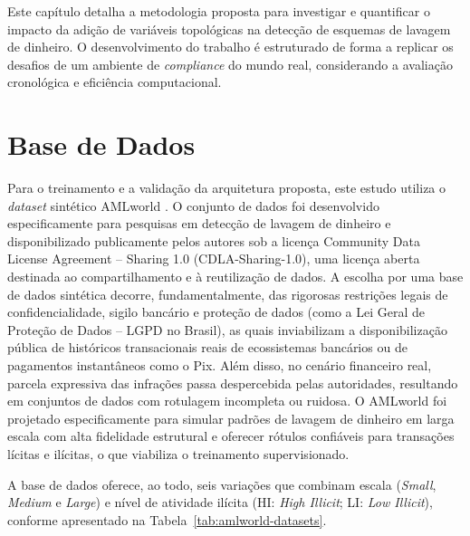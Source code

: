 \documentclass[a4paper,12pt,oneside,onecolumn,final,fleqn]{repUERJ}
\begin{document}
Este capítulo detalha a metodologia proposta para investigar e quantificar o impacto da adição de variáveis topológicas na detecção de esquemas de lavagem de dinheiro. O desenvolvimento do trabalho é estruturado de forma a replicar os desafios de um ambiente de \textit{compliance} do mundo real, considerando a avaliação cronológica e eficiência computacional.

\section{Base de Dados}

Para o treinamento e a validação da arquitetura proposta, este estudo utiliza o \textit{dataset} sintético AMLworld \cite{altman2023realistic}. O conjunto de dados foi desenvolvido especificamente para pesquisas em detecção de lavagem de dinheiro e disponibilizado publicamente pelos autores sob a licença Community Data License Agreement – Sharing 1.0 (CDLA-Sharing-1.0), uma licença aberta destinada ao compartilhamento e à reutilização de dados. A escolha por uma base de dados sintética decorre, fundamentalmente, das rigorosas restrições legais de confidencialidade, sigilo bancário e proteção de dados (como a Lei Geral de Proteção de Dados -- LGPD no Brasil), as quais inviabilizam a disponibilização pública de históricos transacionais reais de ecossistemas bancários ou de pagamentos instantâneos como o Pix. Além disso, no cenário financeiro real, parcela expressiva das infrações passa despercebida pelas autoridades, resultando em conjuntos de dados com rotulagem incompleta ou ruidosa. O AMLworld foi projetado especificamente para simular padrões de lavagem de dinheiro em larga escala com alta fidelidade estrutural e oferecer rótulos confiáveis para transações lícitas e ilícitas, o que viabiliza o treinamento supervisionado.

A base de dados oferece, ao todo, seis variações que combinam escala (\textit{Small},
\textit{Medium} e \textit{Large}) e nível de atividade ilícita (HI: \textit{High Illicit};
LI: \textit{Low Illicit}), conforme apresentado na Tabela~\ref{tab:amlworld-datasets}.
\end{document}
